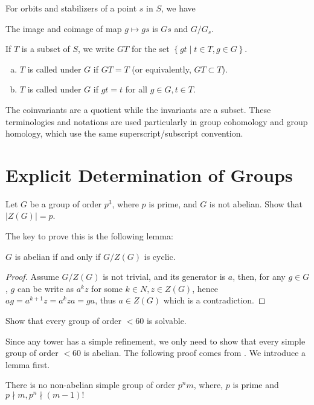 For orbits and stabilizers of a point $s$ in $S$, we have
\begin{thm}
  The image and coimage of map $g\mapsto gs$ is $Gs$ and $G/G_s$.
\end{thm}
If $T$ is a subset of $S$, we write $GT$ for the set $\left\{ gt \mid t \in T , g \in G\right\}$.
  \begin{enumerate}[a)]
    \setlength{\itemindent}{2ex}
    \item $T$ is called  under $G$ if $GT=T$ (or equivalently, $GT\subset T$).
    \item $T$ is called  under $G$ if $gt=t$ for all $g\in G, t\in T$.
  \end{enumerate}
\begin{rem}
The coinvariants are a quotient while the invariants are a subset. These terminologies and notations are used particularly in group cohomology and group homology, which use the same superscript/subscript convention.
\end{rem}
\newpage\section{Explicit Determination of Groups}
\begin{ex}
  Let $G$ be a group of order $p^3$, where $p$ is prime, and $G$ is not abelian. Show that $|Z(G)|=p$.
\end{ex}
The key to prove this is the following lemma:
\begin{lem}
  $G$ is abelian if and only if $G/Z(G)$ is cyclic.
\end{lem}
\begin{proof}
  Assume $G/Z(G)$ is not trivial, and its generator is $a$, then, for any $g\in G$, $g$ can be write as $a^kz$ for some $k\in N, z\in Z(G)$, hence $ag=a^{k+1}z=a^{k}za=ga$, thus $a\in Z(G)$ which is a contradiction.
\end{proof}
\begin{ex}\label{7.8}
  Show that every group of order $<60$ is solvable.
\end{ex}
  Since any tower has a simple refinement, we only need to show that every simple group of order $<60$ is abelian. The following proof comes from \cite{rotman2002advanced}. We introduce a lemma first.
\begin{lem}
  There is no non-abelian simple group of order $p^nm$, where, $p$ is prime and $p\nmid m, p^n\nmid (m-1)!$
\end{lem}
